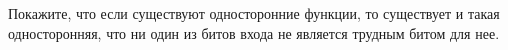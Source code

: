 Покажите, что если существуют односторонние функции, то существует и такая односторонняя, что ни один из
битов входа не является трудным битом для нее.
